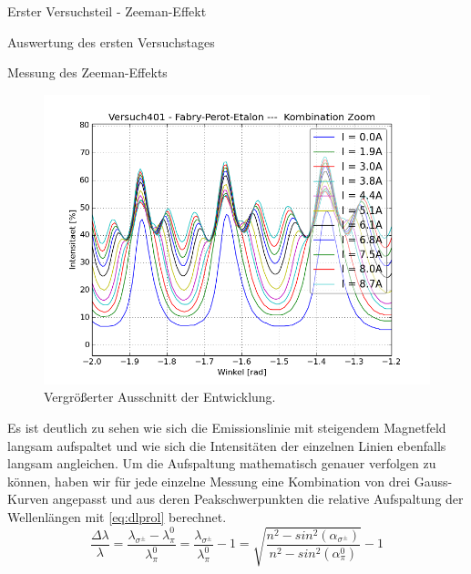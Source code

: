 \documentclass[pdftex, a4paper,11pt, twoside, ngerman]{report}
\begin{document}
\begin{chapter}{Erster Versuchsteil - Zeeman-Effekt}
\begin{section}{Auswertung des ersten Versuchstages}
\begin{subsection}{Messung des Zeeman-Effekts}
\begin{figure}[ht]
\begin{minipage}{0.48\textwidth}
            \includegraphics[width=\textwidth]
                {Figures/Versuch401-Fabry-Perot-Etalon-KombinationZoom_Winkel_Intensitaet.png}
                \caption{Vergrößerter Ausschnitt der Entwicklung.}
            \label{fig:FPEcombiZOOM}
          \end{minipage}
        \end{figure}
        \newline
        Es ist deutlich zu sehen wie sich die Emissionslinie mit steigendem
        Magnetfeld langsam aufspaltet und wie sich die Intensitäten der
        einzelnen Linien ebenfalls langsam angleichen. Um die Aufspaltung
        mathematisch genauer verfolgen zu können, haben wir für jede einzelne
        Messung eine Kombination von drei Gauss-Kurven angepasst und aus deren
        Peakschwerpunkten die relative Aufspaltung der Wellenlängen mit
        \cref{eq:dlprol} berechnet.
        \begin{equation}
          \label{eq:dlprol}
          \frac{\Delta\lambda}{\lambda} = \frac{\lambda_{\sigma^{\pm}}-
          \lambda_{\pi}^{0}}{\lambda_{\pi}^{0}} = \frac{\lambda_{\sigma^{\pm}}} 
          {\lambda_{\pi}^{0}}-1 = \sqrt{\frac{n^{2}-sin^{2}
          (\alpha_{\sigma^{\pm}})}{n^{2}-sin^{2}
          (\alpha_{\pi}^{0})}}-1
        \end{equation}
        \begin{figure}[ht]
          \centering
          \begin{minipage}{0.48\textwidth}
            \centering

\end{minipage}
\end{figure}
\end{subsection}
\end{section}
\end{chapter}
\end{document}
